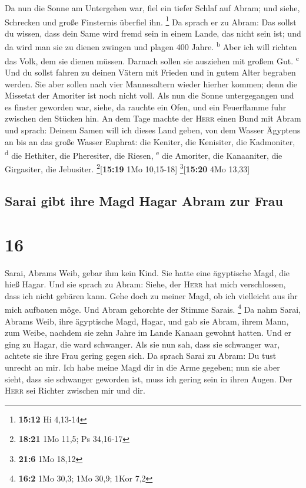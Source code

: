  Da nun die Sonne am Untergehen war, fiel ein tiefer
Schlaf auf Abram; und siehe, Schrecken und große Finsternis überfiel
ihn. \footnote{\textbf{15:12} Hi 4,13-14}  Da sprach er
zu Abram: Das sollst du wissen, dass dein Same wird fremd sein in einem
Lande, das nicht sein ist; und da wird man sie zu dienen zwingen und
plagen 400 Jahre. \textsuperscript{b}  Aber ich will
richten das Volk, dem sie dienen müssen. Darnach sollen sie ausziehen
mit großem Gut. \textsuperscript{c}  Und du sollst fahren
zu deinen Vätern mit Frieden und in gutem Alter begraben werden.
 Sie aber sollen nach vier Mannesaltern wieder hierher
kommen; denn die Missetat der Amoriter ist noch nicht voll.
 Als nun die Sonne untergegangen und es finster geworden
war, siehe, da rauchte ein Ofen, und ein Feuerflamme fuhr zwischen den
Stücken hin.  An dem Tage machte der \textsc{Herr} einen
Bund mit Abram und sprach: Deinem Samen will ich dieses Land geben, von
dem Wasser Ägyptens an bis an das große Wasser Euphrat: 
die Keniter, die Kenisiter, die Kadmoniter, \textsuperscript{d}
 die Hethiter, die Pheresiter, die Riesen,
\textsuperscript{e}  die Amoriter, die Kanaaniter, die
Girgasiter, die Jebusiter. \footnote{\textbf{18:21} 1Mo 11,5; Ps
  34,16-17}{[}\textbf{15:19} 1Mo 10,15-18{]}
\footnote{\textbf{21:6} 1Mo 18,12}{[}\textbf{15:20} 4Mo 13,33{]}

\hypertarget{sarai-gibt-ihre-magd-hagar-abram-zur-frau}{%
\subsection{Sarai gibt ihre Magd Hagar Abram zur
Frau}\label{sarai-gibt-ihre-magd-hagar-abram-zur-frau}}

\hypertarget{section-15}{%
\section{16}\label{section-15}}

 Sarai, Abrams Weib, gebar ihm kein Kind. Sie hatte eine
ägyptische Magd, die hieß Hagar.  Und sie sprach zu Abram:
Siehe, der \textsc{Herr} hat mich verschlossen, dass ich nicht gebären
kann. Gehe doch zu meiner Magd, ob ich vielleicht aus ihr mich aufbauen
möge. Und Abram gehorchte der Stimme Sarais. \footnote{\textbf{16:2} 1Mo
  30,3; 1Mo 30,9; 1Kor 7,2}  Da nahm Sarai, Abrams Weib,
ihre ägyptische Magd, Hagar, und gab sie Abram, ihrem Mann, zum Weibe,
nachdem sie zehn Jahre im Lande Kanaan gewohnt hatten. 
Und er ging zu Hagar, die ward schwanger. Als sie nun sah, dass sie
schwanger war, achtete sie ihre Frau gering gegen sich. 
Da sprach Sarai zu Abram: Du tust unrecht an mir. Ich habe meine Magd
dir in die Arme gegeben; nun sie aber sieht, dass sie schwanger geworden
ist, muss ich gering sein in ihren Augen. Der \textsc{Herr} sei Richter
zwischen mir und dir.

